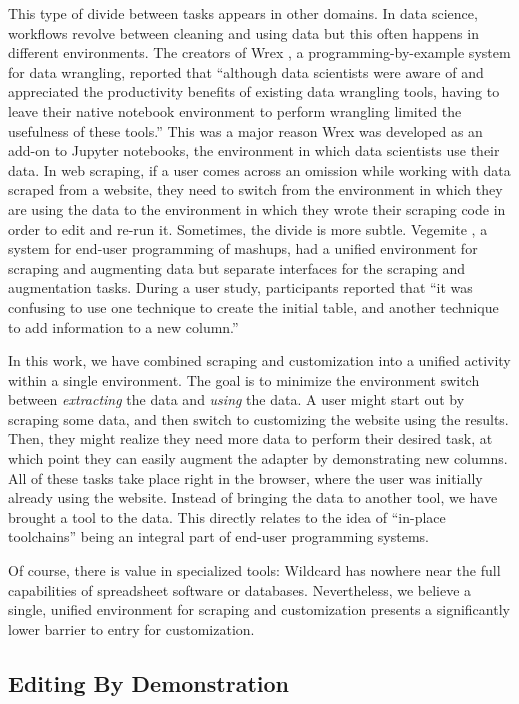 \documentclass[sigconf,10pt]{acmart}
\begin{document}
This type of divide between tasks appears in other domains. In data
science, workflows revolve between cleaning and using data but this
often happens in different environments. The creators of Wrex
\citep{drosos2020}, a programming-by-example system for data wrangling,
reported that ``although data scientists were aware of and appreciated
the productivity benefits of existing data wrangling tools, having to
leave their native notebook environment to perform wrangling limited the
usefulness of these tools.'' This was a major reason Wrex was developed
as an add-on to Jupyter notebooks, the environment in which data
scientists use their data. In web scraping, if a user comes across an
omission while working with data scraped from a website, they need to
switch from the environment in which they are using the data to the
environment in which they wrote their scraping code in order to edit and
re-run it. Sometimes, the divide is more subtle. Vegemite
\citep{lin2009}, a system for end-user programming of mashups, had a
unified environment for scraping and augmenting data but separate
interfaces for the scraping and augmentation tasks. During a user study,
participants reported that ``it was confusing to use one technique to
create the initial table, and another technique to add information to a
new column.''

In this work, we have combined scraping and customization into a unified
activity within a single environment. The goal is to minimize the
environment switch between \emph{extracting} the data and \emph{using}
the data. A user might start out by scraping some data, and then switch
to customizing the website using the results. Then, they might realize
they need more data to perform their desired task, at which point they
can easily augment the adapter by demonstrating new columns. All of
these tasks take place right in the browser, where the user was
initially already using the website. Instead of bringing the data to
another tool, we have brought a tool to the data. This directly relates
to the idea of ``in-place toolchains'' \citep{zotero-60} being an
integral part of end-user programming systems.

Of course, there is value in specialized tools: Wildcard has nowhere
near the full capabilities of spreadsheet software or databases.
Nevertheless, we believe a single, unified environment for scraping and
customization presents a significantly lower barrier to entry for
customization.

\hypertarget{editing-by-demonstration-1}{%
\subsection{Editing By Demonstration}\label{editing-by-demonstration-1}}
\end{document}
